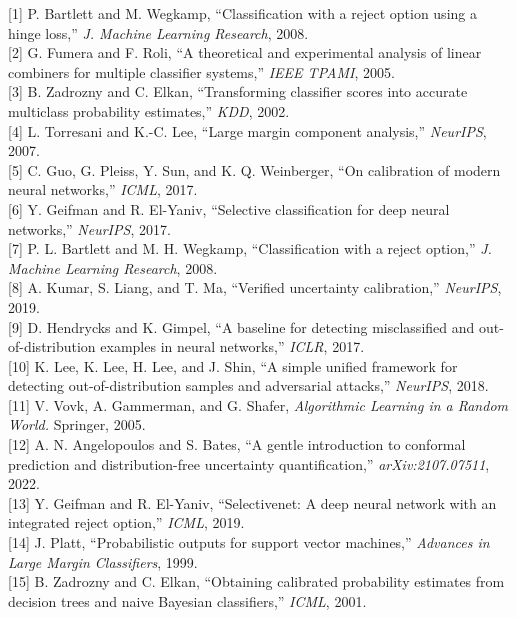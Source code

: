 \documentclass[
  conference]{IEEEtran}
\begin{document}
{[}1{]} P. Bartlett and M. Wegkamp, ``Classification with a reject
option using a hinge loss,'' \emph{J. Machine Learning Research},
2008.\\
{[}2{]} G. Fumera and F. Roli, ``A theoretical and experimental analysis
of linear combiners for multiple classifier systems,'' \emph{IEEE
TPAMI}, 2005.\\
{[}3{]} B. Zadrozny and C. Elkan, ``Transforming classifier scores into
accurate multiclass probability estimates,'' \emph{KDD}, 2002.\\
{[}4{]} L. Torresani and K.-C. Lee, ``Large margin component analysis,''
\emph{NeurIPS}, 2007.\\
{[}5{]} C. Guo, G. Pleiss, Y. Sun, and K. Q. Weinberger, ``On
calibration of modern neural networks,'' \emph{ICML}, 2017.\\
{[}6{]} Y. Geifman and R. El-Yaniv, ``Selective classification for deep
neural networks,'' \emph{NeurIPS}, 2017.\\
{[}7{]} P. L. Bartlett and M. H. Wegkamp, ``Classification with a reject
option,'' \emph{J. Machine Learning Research}, 2008.\\
{[}8{]} A. Kumar, S. Liang, and T. Ma, ``Verified uncertainty
calibration,'' \emph{NeurIPS}, 2019.\\
{[}9{]} D. Hendrycks and K. Gimpel, ``A baseline for detecting
misclassified and out-of-distribution examples in neural networks,''
\emph{ICLR}, 2017.\\
{[}10{]} K. Lee, K. Lee, H. Lee, and J. Shin, ``A simple unified
framework for detecting out-of-distribution samples and adversarial
attacks,'' \emph{NeurIPS}, 2018.\\
{[}11{]} V. Vovk, A. Gammerman, and G. Shafer, \emph{Algorithmic
Learning in a Random World.} Springer, 2005.\\
{[}12{]} A. N. Angelopoulos and S. Bates, ``A gentle introduction to
conformal prediction and distribution-free uncertainty quantification,''
\emph{arXiv:2107.07511}, 2022.\\
{[}13{]} Y. Geifman and R. El-Yaniv, ``Selectivenet: A deep neural
network with an integrated reject option,'' \emph{ICML}, 2019.\\
{[}14{]} J. Platt, ``Probabilistic outputs for support vector
machines,'' \emph{Advances in Large Margin Classifiers}, 1999.\\
{[}15{]} B. Zadrozny and C. Elkan, ``Obtaining calibrated probability
estimates from decision trees and naive Bayesian classifiers,''
\emph{ICML}, 2001.\\
\end{document}
